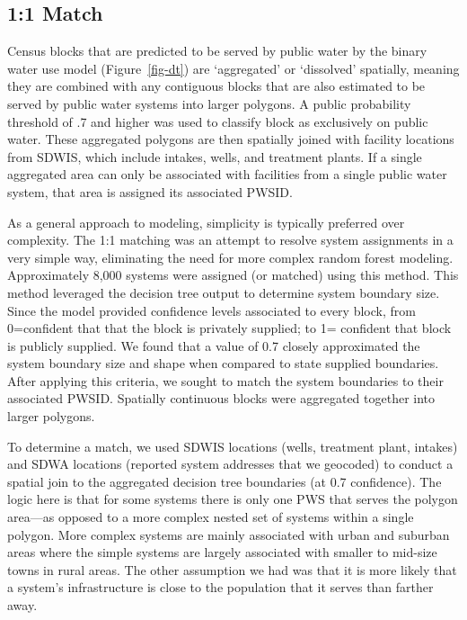 \documentclass[
  letterpaper,
  DIV=11,
  numbers=noendperiod,
  oneside]{scrartcl}
\begin{document}
\subsection{1:1 Match}\label{match}

Census blocks that are predicted to be served by public water by the
binary water use model (Figure~\ref{fig-dt}) are `aggregated' or
`dissolved' spatially, meaning they are combined with any contiguous
blocks that are also estimated to be served by public water systems into
larger polygons. A public probability threshold of .7 and higher was
used to classify block as exclusively on public water. These aggregated
polygons are then spatially joined with facility locations from SDWIS,
which include intakes, wells, and treatment plants. If a single
aggregated area can only be associated with facilities from a single
public water system, that area is assigned its associated PWSID.

As a general approach to modeling, simplicity is typically preferred
over complexity. The 1:1 matching was an attempt to resolve system
assignments in a very simple way, eliminating the need for more complex
random forest modeling. Approximately 8,000 systems were assigned (or
matched) using this method. This method leveraged the decision tree
output to determine system boundary size. Since the model provided
confidence levels associated to every block, from 0=confident that that
the block is privately supplied; to 1= confident that block is publicly
supplied. We found that a value of 0.7 closely approximated the system
boundary size and shape when compared to state supplied boundaries.
After applying this criteria, we sought to match the system boundaries
to their associated PWSID. Spatially continuous blocks were aggregated
together into larger polygons.

To determine a match, we used SDWIS locations (wells, treatment plant,
intakes) and SDWA locations (reported system addresses that we geocoded)
to conduct a spatial join to the aggregated decision tree boundaries (at
0.7 confidence). The logic here is that for some systems there is only
one PWS that serves the polygon area---as opposed to a more complex
nested set of systems within a single polygon. More complex systems are
mainly associated with urban and suburban areas where the simple systems
are largely associated with smaller to mid-size towns in rural areas.
The other assumption we had was that it is more likely that a system's
infrastructure is close to the population that it serves than farther
away.
\end{document}
